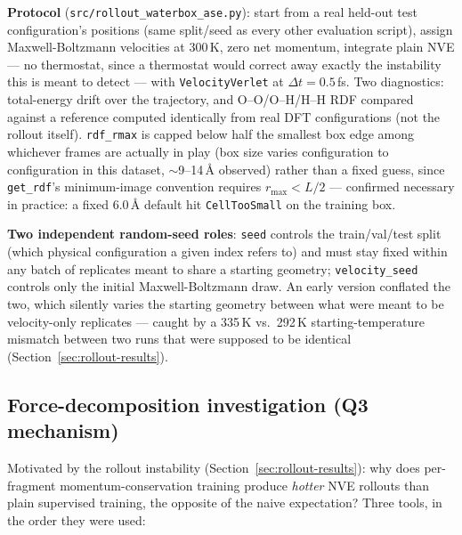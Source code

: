 \documentclass[11pt]{article}
\begin{document}
\textbf{Protocol} (\texttt{src/rollout\_waterbox\_ase.py}): start from a real
held-out test configuration's positions (same split/seed as every other
evaluation script), assign Maxwell-Boltzmann velocities at 300\,K, zero net
momentum, integrate plain NVE --- no thermostat, since a thermostat would
correct away exactly the instability this is meant to detect --- with
\texttt{VelocityVerlet} at $\Delta t = 0.5$\,fs. Two diagnostics: total-energy
drift over the trajectory, and O--O/O--H/H--H RDF compared against a
reference computed identically from real DFT configurations (not the
rollout itself). \texttt{rdf\_rmax} is capped below half the smallest box
edge among whichever frames are actually in play (box size varies
configuration to configuration in this dataset, $\sim$9--14\,\AA{} observed)
rather than a fixed guess, since \texttt{get\_rdf}'s minimum-image
convention requires $r_{\max} < L/2$ --- confirmed necessary in practice: a
fixed 6.0\,\AA{} default hit \texttt{CellTooSmall} on the training box.

\textbf{Two independent random-seed roles}: \texttt{seed} controls the
train/val/test split (which physical configuration a given index refers to)
and must stay fixed within any batch of replicates meant to share a starting
geometry; \texttt{velocity\_seed} controls only the initial
Maxwell-Boltzmann draw. An early version conflated the two, which silently
varies the starting geometry between what were meant to be velocity-only
replicates --- caught by a 335\,K vs.\ 292\,K starting-temperature mismatch
between two runs that were supposed to be identical (Section~\ref{sec:rollout-results}).

\subsection{Force-decomposition investigation (Q3 mechanism)}
\label{sec:force-decomposition-methods}

Motivated by the rollout instability (Section~\ref{sec:rollout-results}):
why does per-fragment momentum-conservation training produce \emph{hotter}
NVE rollouts than plain supervised training, the opposite of the naive
expectation? Three tools, in the order they were used:
\end{document}
